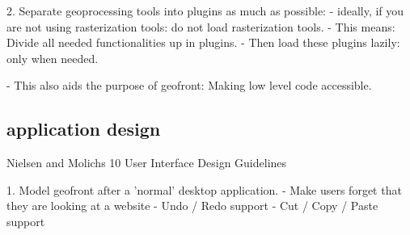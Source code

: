 2. Separate geoprocessing tools into plugins as much as possible: 
  - ideally, if you are not using rasterization tools: do not load rasterization tools. 
  - This means: Divide all needed functionalities up in plugins.
     - Then load these plugins lazily: only when needed.

  - This also aids the purpose of geofront: Making low level code accessible.

\subsection{application design}

Nielsen and Molichs 10 User Interface Design Guidelines

1. Model geofront after a 'normal' desktop application. 
  - Make users forget that they are looking at a website
  - Undo / Redo support
  - Cut / Copy / Paste support


